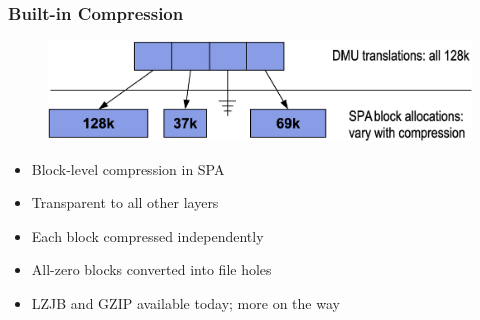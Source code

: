 \begin{frame}[fragile]
    \frametitle{Built-in Compression}
    \begin{figure}
    \includegraphics[width=0.8\linewidth]{figs/ZFS-compression.png}
    \end{figure}
    \begin{itemize}
        \item Block-level compression in SPA
        \item Transparent to all other layers \pause
        \item Each block compressed independently
        \item All-zero blocks converted into file holes
        \item LZJB and GZIP available today; more on the way
    \end{itemize}
\end{frame}
% 
% 
% 

